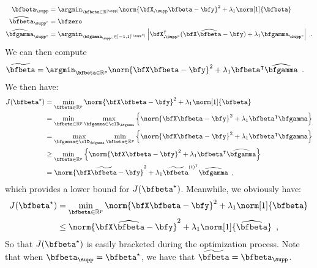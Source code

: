 \begin{align*}
  \bfbeta_\supp & = \argmin_{\bfbeta\in\mathbb{R}^{|\supp|}} 
                  \norm{\bfX_{\centerdot\supp} \bfbeta - \bfy}^2 + \lambda_1 \norm[1]{\bfbeta}
  \\
  \widehat\bfbeta_{\supp^c} & = \bfzero \\ 
  \widehat\bfgamma_{\supp^c} & = \argmin_{\bfgamma_{\supp^c} \in [-1,1]^{|\supp^c|}}
                           \left|  \bfX_{\centerdot\supp^c}^\intercal(\bfX\widehat\bfbeta-\bfy) + 
                             \lambda_1 \bfgamma_{\supp^c} \right|
    \enspace. 
\end{align*}
We can then compute 
\begin{align*}
  \widetilde{\bfbeta} & = \argmin_{\bfbeta\in\mathbb{R}^{p}} 
                  \norm{\bfX \bfbeta - \bfy}^2 + \lambda_1 \bfbeta^\intercal\widehat\bfgamma
    \enspace. 
\end{align*}
We then have:
\begin{align*}
J(\bfbeta^\star) & = \min_{\bfbeta\in\mathbb{R}^p} 
  \norm{\bfX \bfbeta - \bfy}^2 + \lambda_1  \norm[1]{\bfbeta} \\
  &= \min_{\bfbeta\in\mathbb{R}^p} \max_{\bfgamma \in \clD_{\bfgamma}}
      \Big\{ \norm{\bfX \bfbeta - \bfy}^2 + \lambda_1 \bfbeta^\intercal\bfgamma \Big\} \\
  &= \max_{\bfgamma \in \clD_{\bfgamma}} \min_{\bfbeta\in\mathbb{R}^p}
      \Big\{ \norm{\bfX \bfbeta - \bfy}^2 + \lambda_1 \bfbeta^\intercal\bfgamma \Big\} \\
  & \geq \min_{\bfbeta\in\mathbb{R}^p}
      \Big\{ \norm{\bfX \bfbeta - \bfy}^2 + \lambda_1 \bfbeta^\intercal\widehat\bfgamma \Big\}  \\
  & = \norm{\bfX \widetilde{\bfbeta} - \bfy}^2 + \lambda_1 \widetilde{\bfbeta}^{(t)^\intercal}\widehat\bfgamma
  \enspace,
\end{align*}
which provides a lower bound for $J(\bfbeta^\star)$.
Meanwhile, we obviously have:
\begin{align*}
J(\bfbeta^\star) & = \min_{\bfbeta\in\mathbb{R}^p} 
  \norm{\bfX \bfbeta - \bfy}^2 + \lambda_1 \norm[1]{\bfbeta} \\
  &\leq \norm{\bfX \widehat\bfbeta - \bfy}^2 + \lambda_1  \norm[1]{\widehat\bfbeta} 
  \enspace,
\end{align*}
So that $J(\bfbeta^\star)$ is easily bracketed during the optimization process. 
Note that when $\bfbeta_\supp=\bfbeta^\star$, we have that
$\widetilde{\bfbeta}=\bfbeta_\supp$.



